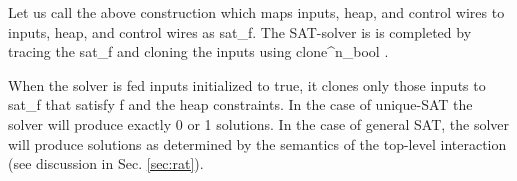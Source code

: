 \documentclass[preprint]{sigplanconf}
\newcommand{\xcomment}[2]{\textbf{#1:~\textsl{#2}}}
\newcommand{\amr}[1]{\xcomment{Amr}{#1}}
\newcommand{\roshan}[1]{\xcomment{Roshan}{#1}}
\begin{document}
\begin{center}
\end{center}  


Let us call the above construction which maps inputs, heap, and
control wires to inputs, heap, and control wires as {{sat_f}}. The
SAT-solver is is completed by tracing the {{sat_f}} and cloning the
inputs using {{clone^n_{bool} }}.

\begin{center}
\end{center}  

When the solver is fed inputs initialized to {{true}}, it clones only
those inputs to {{sat_f}} that satisfy {{f}} and the heap
constraints. In the case of unique-SAT the solver will produce exactly
0 or 1 solutions. In the case of general SAT, the solver will produce
solutions as determined by the semantics of the top-level interaction
(see discussion in Sec. \ref{sec:rat}).



\end{document}
